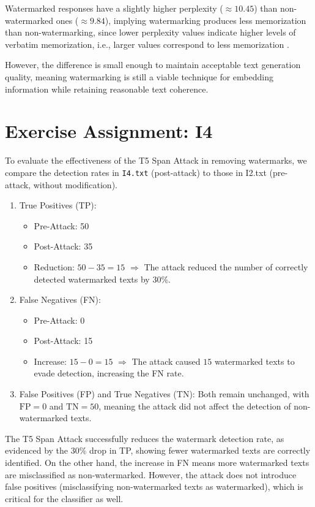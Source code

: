 \documentclass{article}
\begin{document}
Watermarked responses have a slightly higher perplexity ($\approx 10.45$) than non-watermarked ones ($\approx 9.84$), implying watermarking produces less memorization than non-watermarking, since lower perplexity values indicate higher levels of verbatim memorization, i.e., larger values correspond to less memorization \cite{panaitesculiess2024watermarkinglargelanguagemodels}.

However, the difference is small enough to maintain acceptable text generation quality, meaning watermarking is still a viable technique for embedding information while retaining reasonable text coherence.

\section{Exercise Assignment: I4}\label{sec:i4}
To evaluate the effectiveness of the T5 Span Attack in removing watermarks, we compare the detection rates in \texttt{I4.txt} (post-attack) to those in I2.txt (pre-attack, without modification).

\begin{enumerate}
    \item True Positives (TP):
          \begin{itemize}
              \item Pre-Attack: 50
              \item Post-Attack: 35
              \item Reduction: \( 50 - 35 = 15 \) $\Rightarrow$ The attack reduced the number of correctly detected watermarked texts by 30\%.
          \end{itemize}
    \item False Negatives (FN):
          \begin{itemize}
              \item Pre-Attack: 0
              \item Post-Attack: 15
              \item Increase: \( 15 - 0 = 15 \) $\Rightarrow$ The attack caused $15$ watermarked texts to evade detection, increasing the FN rate.
          \end{itemize}
    \item False Positives (FP) and True Negatives (TN): Both remain unchanged, with \( \text{FP} = 0 \) and \( \text{TN} = 50 \), meaning the attack did not affect the detection of non-watermarked texts.
\end{enumerate}

The T5 Span Attack successfully reduces the watermark detection rate, as evidenced by the $30\%$ drop in TP, showing fewer watermarked texts are correctly identified. On the other hand, the increase in FN means more watermarked texts are misclassified as non-watermarked. However, the attack does not introduce false positives (misclassifying non-watermarked texts as watermarked), which is critical for the classifier as well.
\end{document}
